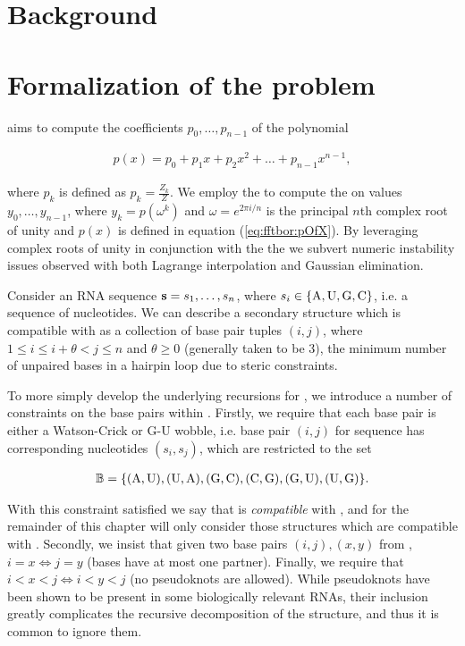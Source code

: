 \section{Background}
\label{sec:fftbor:bkgrnd}

\section{Formalization of the problem}
\label{sec:fftbor:formal}

\fftbor aims to compute the coefficients $p_0,\dots,p_{n-1}$ of the polynomial

\begin{align}
\label{eq:fftbor:pOfX}
p(x) = p_0 + p_1 x + p_2 x^2 + \dots + p_{n-1} x^{n-1},
\end{align}

where $p_k$ is defined as $p_k = \frac{Z_k}{Z}$. We employ the \fft to compute
the \idft on values $y_0,\dots,y_{n-1}$, where
$y_k = p(\omega^k)$ and $\omega = e^{2 \pi i/n}$ is the principal $n$th complex
root of unity and $p(x)$ is defined in
equation (\ref{eq:fftbor:pOfX}). By leveraging
complex
roots of unity in conjunction with the \idft the we subvert numeric instability
issues observed with both Lagrange interpolation and Gaussian elimination.

Consider an RNA sequence ${\bf s} = s_1,\dots,s_n$, where
$s_i \in \{\text{A,\,U,\,G,\,C}\}$, i.e. a sequence of nucleotides. We can describe a
secondary structure \str which is compatible with \seq as a collection of
base pair tuples $(i,j)$, where $1 \le i \le i+\theta < j \le n$ and
$\theta \ge 0$ (generally taken to be 3), the minimum number of unpaired bases
in a hairpin loop due to steric constraints.

To more simply develop the underlying recursions for \fftbor, we introduce a
number of constraints on the base pairs within \str. Firstly, we require that
each base pair is either a Watson-Crick or G-U wobble, i.e. base pair $(i,j)$
for sequence \seq has corresponding nucleotides $(s_i,s_j)$, which are
restricted to the set

\begin{align}
\label{eq:fftbor:validBP}
\bpSet =
\{\text{(A,\,U),\,(U,\,A),\,(G,\,C),\,(C,\,G),\,(G,\,U),\,(U,\,G)}\}.
\end{align}

With
this constraint satisfied we say that \str is {\em compatible} with \seq, and
for the remainder of this chapter will only consider those structures which are
compatible with \seq.
Secondly, we insist that given two base pairs $(i,j), (x,y)$ from \str,
$i=x \iff j=y$ (bases have at most one partner). Finally, we require that
$i<x<j \iff i<y<j$ (no pseudoknots are allowed). While pseudoknots have been
shown to be present in some biologically relevant RNAs, their inclusion greatly
complicates the recursive decomposition of the structure, and thus it is common
to ignore them.

